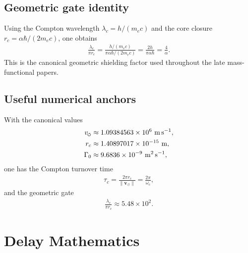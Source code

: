 \documentclass[11pt]{article}
\theoremstyle{definition}
\theoremstyle{plain}
\theoremstyle{remark}
\newcommand{\swirlarrow}{\mathchoice{\mkern-2mu\scriptstyle\boldsymbol{\circlearrowleft}}{\mkern-2mu\scriptstyle\boldsymbol{\circlearrowleft}}{\mkern-2mu\scriptscriptstyle\boldsymbol{\circlearrowleft}}{\mkern-2mu\scriptscriptstyle\boldsymbol{\circlearrowleft}}}
\newcommand{\rc}{{r_c}}
\newcommand{\vnorm}{\lVert \mathbf{v}_{\!\boldsymbol{\circlearrowleft}} \rVert}
\begin{document}
        \subsection{Geometric gate identity}
            Using the Compton wavelength $\lambda_c = h/(m_e c)$ and the core closure $r_c = \alpha\hbar/(2m_e c)$, one obtains
            \begin{align}
                \frac{\lambda_c}{\pi r_c}
                =
                \frac{h/(m_e c)}{\pi \alpha \hbar /(2m_e c)}
                =
                \frac{2h}{\pi \alpha \hbar}
                =
                \frac{4}{\alpha}.
            \end{align}
            This is the canonical geometric shielding factor used throughout the late mass-functional papers.

        \subsection{Useful numerical anchors}
            With the canonical values
            \begin{align}
                v_{\swirlarrow} &\approx 1.09384563\times 10^6\ \mathrm{m\,s^{-1}}, \\
                r_c &\approx 1.40897017\times 10^{-15}\ \mathrm{m}, \\
                \Gamma_0 &\approx 9.6836\times 10^{-9}\ \mathrm{m^2\,s^{-1}},
            \end{align}
            one has the Compton turnover time
            \begin{align}
                \tau_c = \frac{2\pi \rc}{\vnorm} = \frac{2\pi}{\omega_c},
            \end{align}
            and the geometric gate
            \begin{align}
                \frac{\lambda_c}{\pi \rc} \approx 5.48\times 10^2.
            \end{align}

    \section{Delay Mathematics}
        \label{sec:appendix_delay}
\end{document}
